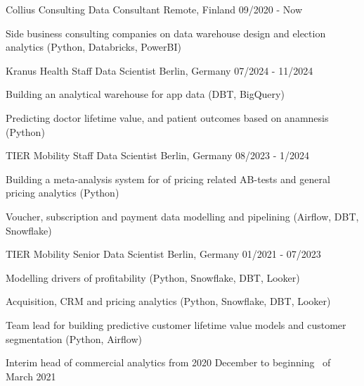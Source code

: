
\begin{cventries}


  \cventry
    {Collius Consulting} %
    {Data Consultant} %
    {Remote, Finland} %
    {09/2020 - Now} %
    {
      \begin{cvitems}
        \item {Side business consulting companies on data warehouse design and election analytics (Python, Databricks, PowerBI)}
      \end{cvitems}
    }

  \cventry
    {Kranus Health} %
    {Staff Data Scientist} %
    {Berlin, Germany} %
    {07/2024 - 11/2024} %
    {
      \begin{cvitems}
        \item {Building an analytical warehouse for app data (DBT, BigQuery)}
        \item {Predicting doctor lifetime value, and patient outcomes based on anamnesis (Python)}
      \end{cvitems}
    }

  \cventry
    {TIER Mobility} %
    {Staff Data Scientist} %
    {Berlin, Germany} %
    {08/2023 - 1/2024} %
    {
      \begin{cvitems}
        \item {Building a meta-analysis system for of pricing related AB-tests and general pricing analytics (Python)}
        \item {Voucher, subscription and payment data modelling and pipelining (Airflow, DBT, Snowflake)}
      \end{cvitems}
    }

  \cventry
    {TIER Mobility} %
    {Senior Data Scientist} %
    {Berlin, Germany} %
    {01/2021 - 07/2023} %
    {
      \begin{cvitems}
        \item {Modelling drivers of profitability (Python, Snowflake, DBT, Looker)}
        \item {Acquisition, CRM and pricing analytics (Python, Snowflake, DBT, Looker)}
        \item {Team lead for building predictive customer lifetime
        value models and customer segmentation (Python, Airflow)}
        \item {Interim head of commercial analytics from 2020 December to beginning \
        of March 2021}
      \end{cvitems}
    }


\end{cventries}

